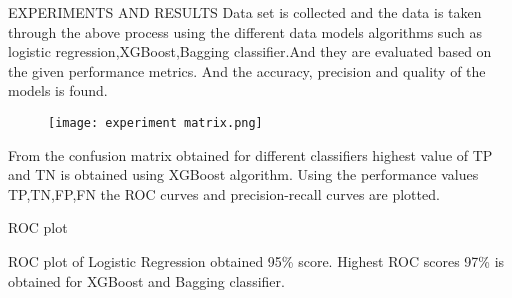 \documentclass{beamer}
\begin{document}
\begin{frame}{EXPERIMENTS AND RESULTS}
Data set is collected and the data is taken through the above process using the different  data models  algorithms such as logistic regression,XGBoost,Bagging classifier.And they are evaluated based on the given performance metrics. And the accuracy, precision and quality of the models is found.
\begin{figure}[ht]
    \centering
    \texttt{[image: experiment matrix.png]}
\end{figure}
From the confusion matrix obtained for different classifiers highest value of TP and TN is obtained using XGBoost algorithm.
Using the performance values TP,TN,FP,FN the ROC curves and precision-recall curves are plotted.
\end{frame}
\begin{frame}
\begin{block}{ROC plot}
\begin{figure}[ht]
 \hfill 	
 \hfill	
\end{figure}
ROC plot of Logistic Regression  obtained 95\% score. Highest ROC scores 97\% is obtained for XGBoost 
and Bagging classifier.
\end{block}
\end{frame}
\end{document}
